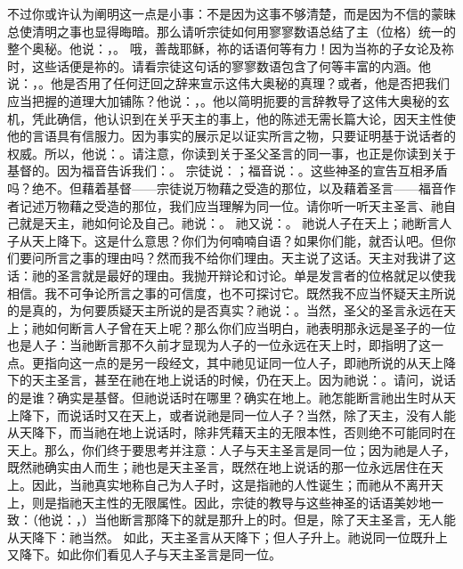 不过你或许认为阐明这一点是小事：不是因为这事不够清楚，而是因为不信的蒙昧总使清明之事也显得晦暗。那么请听宗徒如何用寥寥数语总结了主（位格）统一的整个奥秘。他说：，。 哦，善哉耶稣，祢的话语何等有力！因为当祢的子女论及祢时，这些话便是祢的。请看宗徒这句话的寥寥数语包含了何等丰富的内涵。他说：，。他是否用了任何迂回之辞来宣示这伟大奥秘的真理？或者，他是否把我们应当把握的道理大加铺陈？他说：，。他以简明扼要的言辞教导了这伟大奥秘的玄机，凭此确信，他认识到在关乎天主的事上，他的陈述无需长篇大论，因天主性使他的言语具有信服力。因为事实的展示足以证实所言之物，只要证明基于说话者的权威。所以，他说：。请注意，你读到关于圣父圣言的同一事，也正是你读到关于基督的。因为福音告诉我们：。 宗徒说：；福音说：。这些神圣的宣告互相矛盾吗？绝不。但藉着基督——宗徒说万物藉之受造的那位，以及藉着圣言——福音作者记述万物藉之受造的那位，我们应当理解为同一位。请你听一听天主圣言、祂自己就是天主，祂如何论及自己。祂说：。 祂又说：。 祂说人子在天上；祂断言人子从天上降下。这是什么意思？你们为何喃喃自语？如果你们能，就否认吧。但你们要问所言之事的理由吗？然而我不给你们理由。天主说了这话。天主对我讲了这话：祂的圣言就是最好的理由。我抛开辩论和讨论。单是发言者的位格就足以使我相信。我不可争论所言之事的可信度，也不可探讨它。既然我不应当怀疑天主所说的是真的，为何要质疑天主所说的是否真实？祂说：。当然，圣父的圣言永远在天上；祂如何断言人子曾在天上呢？那么你们应当明白，祂表明那永远是圣子的一位也是人子：当祂断言那不久前才显现为人子的一位永远在天上时，即指明了这一点。更指向这一点的是另一段经文，其中祂见证同一位人子，即祂所说的从天上降下的天主圣言，甚至在祂在地上说话的时候，仍在天上。因为祂说：。请问，说话的是谁？确实是基督。但祂说话时在哪里？确实在地上。祂怎能断言祂出生时从天上降下，而说话时又在天上，或者说祂是同一位人子？当然，除了天主，没有人能从天降下，而当祂在地上说话时，除非凭藉天主的无限本性，否则绝不可能同时在天上。那么，你们终于要思考并注意：人子与天主圣言是同一位；因为祂是人子，既然祂确实由人而生；祂也是天主圣言，既然在地上说话的那一位永远居住在天上。因此，当祂真实地称自己为人子时，这是指祂的人性诞生；而祂从不离开天上，则是指祂天主性的无限属性。因此，宗徒的教导与这些神圣的话语美妙地一致：（他说：，）当他断言那降下的就是那升上的时。但是，除了天主圣言，无人能从天降下：祂当然。 如此，天主圣言从天降下；但人子升上。祂说同一位既升上又降下。如此你们看见人子与天主圣言是同一位。\par


